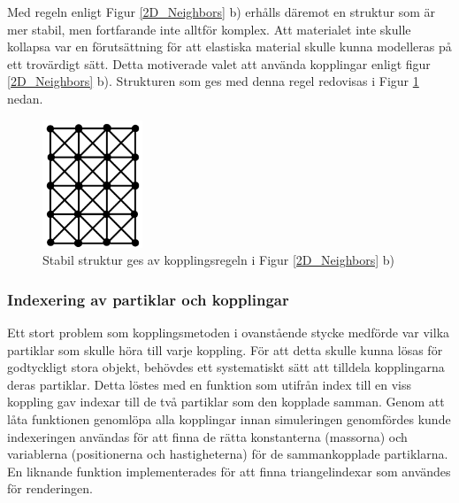 \documentclass[a4paper,12pt,oneside,final,swedish]{extarticle}
\begin{document}
\noindent Med regeln enligt Figur \ref{2D_Neighbors} b) erhålls däremot en struktur som är mer stabil, men fortfarande inte alltför komplex. Att materialet inte skulle kollapsa var en förutsättning för att elastiska material skulle kunna modelleras på ett trovärdigt sätt. Detta motiverade valet att använda kopplingar enligt figur \ref{2D_Neighbors} b). Strukturen som ges med denna regel redovisas i Figur \ref{2D_stabil} nedan.

\begin{figure}[h!]
  \begin{center}
    \includegraphics[width=3cm]{Bilder/2D_stabil.png} 
  \end{center}
  \caption{Stabil struktur ges av kopplingsregeln i Figur \ref{2D_Neighbors} b)}
  \label{2D_stabil}
\end{figure}

\subsubsection{Indexering av partiklar och kopplingar}
Ett stort problem som kopplingsmetoden i ovanstående stycke medförde var vilka partiklar som skulle höra till varje koppling. För att detta skulle kunna lösas för godtyckligt stora objekt, behövdes ett systematiskt sätt att tilldela kopplingarna deras partiklar. Detta löstes med en funktion som utifrån index till en viss koppling gav indexar till de två partiklar som den kopplade samman. Genom att låta funktionen genomlöpa alla kopplingar innan simuleringen genomfördes kunde indexeringen användas för att finna de rätta konstanterna (massorna) och variablerna (positionerna och hastigheterna) för de sammankopplade partiklarna. En liknande funktion implementerades för att finna triangelindexar som användes för renderingen.
\end{document}
